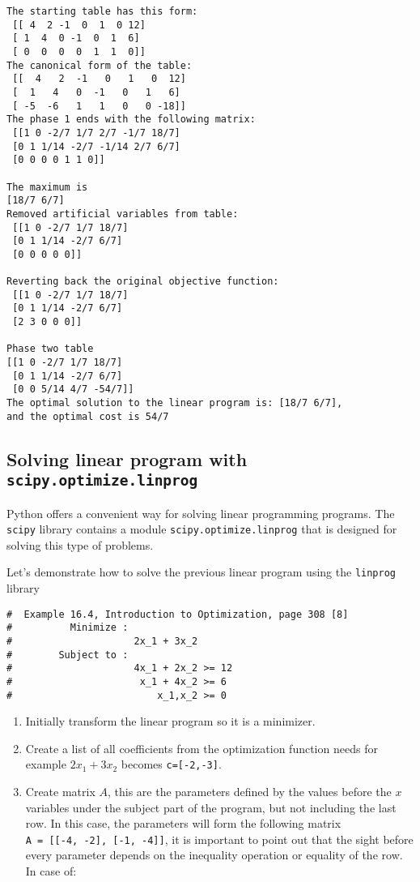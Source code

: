 \documentclass[11pt]{article}
\providecommand{\tightlist}{%
      \setlength{\itemsep}{0pt}\setlength{\parskip}{0pt}}
\begin{document}
    \begin{Verbatim}[commandchars=\\\{\}]
The starting table has this form:
 [[ 4  2 -1  0  1  0 12]
 [ 1  4  0 -1  0  1  6]
 [ 0  0  0  0  1  1  0]]
The canonical form of the table:
 [[  4   2  -1   0   1   0  12]
 [  1   4   0  -1   0   1   6]
 [ -5  -6   1   1   0   0 -18]]
The phase 1 ends with the following matrix:
 [[1 0 -2/7 1/7 2/7 -1/7 18/7]
 [0 1 1/14 -2/7 -1/14 2/7 6/7]
 [0 0 0 0 1 1 0]]

The maximum is
[18/7 6/7]
Removed artificial variables from table:
 [[1 0 -2/7 1/7 18/7]
 [0 1 1/14 -2/7 6/7]
 [0 0 0 0 0]]

Reverting back the original objective function:
 [[1 0 -2/7 1/7 18/7]
 [0 1 1/14 -2/7 6/7]
 [2 3 0 0 0]]

Phase two table
[[1 0 -2/7 1/7 18/7]
 [0 1 1/14 -2/7 6/7]
 [0 0 5/14 4/7 -54/7]]
The optimal solution to the linear program is: [18/7 6/7],
and the optimal cost is 54/7
    \end{Verbatim}

    \newpage

\subsection{\texorpdfstring{Solving linear program with
\texttt{scipy.optimize.linprog}}{Solving linear program with scipy.optimize.linprog}}\label{solving-linear-program-with-scipy.optimize.linprog}

Python offers a convenient way for solving linear programming programs.
The \texttt{scipy} library contains a module
\texttt{scipy.optimize.linprog} that is designed for solving this type
of problems.

Let's demonstrate how to solve the previous linear program using the
\texttt{linprog} library

\begin{verbatim}
#  Example 16.4, Introduction to Optimization, page 308 [8]
#          Minimize :
#                     2x_1 + 3x_2
#        Subject to :
#                     4x_1 + 2x_2 >= 12
#                      x_1 + 4x_2 >= 6
#                         x_1,x_2 >= 0
\end{verbatim}

\begin{enumerate}
\def\labelenumi{\arabic{enumi}.}
\tightlist
\item
  Initially transform the linear program so it is a minimizer.
\item
  Create a list of all coefficients from the optimization function needs
  for example \(2x_1 + 3x_2\) becomes \texttt{c={[}-2,-3{]}}.
\item
  Create matrix \(A\), this are the parameters defined by the values
  before the \(x\) variables under the subject part of the program, but
  not including the last row. In this case, the parameters will form the
  following matrix \texttt{A\ =\ {[}{[}-4,\ -2{]},\ {[}-1,\ -4{]}{]}},
  it is important to point out that the sight before every parameter
  depends on the inequality operation or equality of the row. In case
  of:
\end{enumerate}
\end{document}
